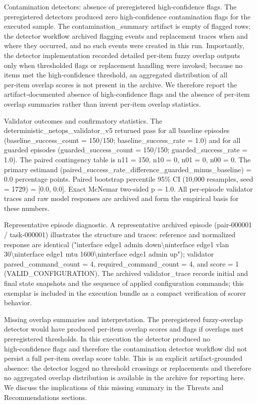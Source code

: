 \documentclass[conference]{IEEEtran}
\begin{document}
Contamination detectors: absence of preregistered high‑confidence flags. The preregistered detectors produced zero high‑confidence contamination flags for the executed sample. The contamination\_summary artifact is empty of flagged rows; the detector workflow archived flagging events and replacement traces when and where they occurred, and no such events were created in this run. Importantly, the detector implementation recorded detailed per‑item fuzzy overlap outputs only when thresholded flags or replacement handling were invoked; because no items met the high‑confidence threshold, an aggregated distribution of all per‑item overlap scores is not present in the archive. We therefore report the artifact‑documented absence of high‑confidence flags and the absence of per‑item overlap summaries rather than invent per‑item overlap statistics.

Validator outcomes and confirmatory statistics. The deterministic\_netops\_validator\_v5 returned pass for all baseline episodes (baseline\_success\_count = 150/150; baseline\_success\_rate = 1.0) and for all guarded episodes (guarded\_success\_count = 150/150; guarded\_success\_rate = 1.0). The paired contingency table is n11 = 150, n10 = 0, n01 = 0, n00 = 0. The primary estimand (paired\_success\_rate\_difference\_guarded\_minus\_baseline) = 0.0 percentage points. Paired bootstrap percentile 95\% CI (10,000 resamples, seed = 1729) = [0.0, 0.0]. Exact McNemar two‑sided p = 1.0. All per‑episode validator traces and raw model responses are archived and form the empirical basis for these numbers.

Representative episode diagnostic. A representative archived episode (pair‑000001 / task‑000001) illustrates the structure and traces: reference and normalized response are identical ("interface edge1 admin down\textbackslash{}ninterface edge1 vlan 30\textbackslash{}ninterface edge1 mtu 1600\textbackslash{}ninterface edge1 admin up"); validator parsed\_command\_count = 4, required\_command\_count = 4, and score = 1 (VALID\_CONFIGURATION). The archived validator\_trace records initial and final state snapshots and the sequence of applied configuration commands; this exemplar is included in the execution bundle as a compact verification of scorer behavior.

Missing overlap summaries and interpretation. The preregistered fuzzy‑overlap detector would have produced per‑item overlap scores and flags if overlaps met preregistered thresholds. In this execution the detector produced no high‑confidence flags and therefore the contamination detector workflow did not persist a full per‑item overlap score table. This is an explicit artifact‑grounded absence: the detector logged no threshold crossings or replacements and therefore no aggregated overlap distribution is available in the archive for reporting here. We discuss the implications of this missing summary in the Threats and Recommendations sections.
\end{document}
